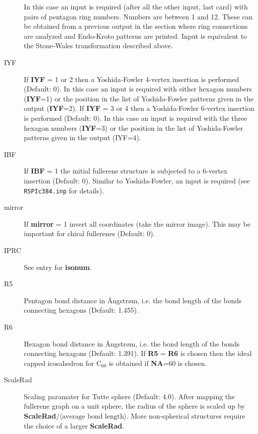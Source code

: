 \documentclass[article,a4paper,twoside]{memoir}
\newcommand{\C}[1]{\ensuremath{\mathrm{C}_{#1}}}
\newcommand{\filename}[1]{\texttt{#1}}
\newcommand{\paramname}[1]{{\color{green}\textbf{#1}}}
\begin{document}
\begin{description}
In this case an input is required (after all the other input, last card) with pairs of
pentagon ring numbers. Numbers are between 1 and 12. These can be obtained
from a previous output in the section where ring connections are analyzed
and Endo-Kroto patterns are printed. Input is equivalent to the Stone-Wales transformation described above.
\item[IYF] 
If \paramname{IYF} = 1 or 2 then a Yoshida-Fowler 4-vertex insertion \cite{Yoshida97a} is performed (Default: 0). 
In this case an input is required  with either hexagon numbers (\paramname{IYF}=1) or the position in
the list of Yoshida-Fowler patterns given in the output (\paramname{IYF}=2).
If \paramname{IYF} = 3 or 4 then a Yoshida-Fowler 6-vertex insertion \cite{Yoshida97a} is performed (Default: 0). 
In this case an input is required with the three hexagon numbers (\paramname{IYF}=3) or the position in
the list of Yoshida-Fowler patterns given in the output (IYF=4).
\item[IBF] 
If \paramname{IBF} = 1 the initial fullerene structure is subjected to a 6-vertex insertion (Default: 0).
Similar to Yoshida-Fowler, an input is required (see \filename{RSPIc384.inp} for details).
\item[mirror] 
If \paramname{mirror} = 1 invert all coordinates (take the mirror image). This may be important for chiral fullerenes (Default: 0).
\item[IPRC] See entry for \paramname{isonum}.
\item[R5] Pentagon bond distance in \AA ngstr{\o}m, i.e. the bond length of the bonds connecting hexagons (Default: 1.455).
\item[R6] Hexagon  bond distance in \AA ngstr{\o}m, i.e. the bond length of the bonds connecting hexagons (Default: 1.391).
If \paramname{R5} = \paramname{R6} is chosen then the ideal capped icosahedron for \C{60} is obtained if \paramname{NA}=60 is chosen.
\item[ScaleRad] Scaling paramater for Tutte sphere (Default: 4.0).  After mapping the fullerene graph
on a unit sphere, the radius of the sphere is scaled up by \paramname{ScaleRad}$/\langle\text{average bond length}\rangle$.
More non-spherical structures require the choice of a larger \paramname{ScaleRad}.
\end{description}
\end{document}
